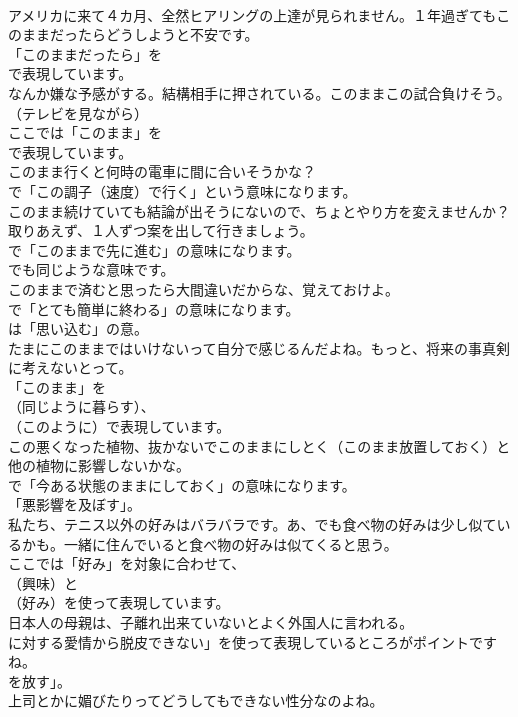 \documentclass[8pt]{extreport}
\begin{document}
\begin{CJK}{UTF8}{min}
\\	アメリカに来て４カ月、全然ヒアリングの上達が見られません。１年過ぎてもこのままだったらどうしようと不安です。 
\\	「このままだったら」を 
\\	で表現しています。	
\\	なんか嫌な予感がする。結構相手に押されている。このままこの試合負けそう。（テレビを見ながら） 
\\	ここでは「このまま」を 
\\	で表現しています。	
\\	このまま行くと何時の電車に間に合いそうかな？ 
\\	で「この調子（速度）で行く」という意味になります。	
\\	このまま続けていても結論が出そうにないので、ちょとやり方を変えませんか？取りあえず、１人ずつ案を出して行きましょう。 
\\	で「このままで先に進む」の意味になります。
\\	でも同じような意味です。	
\\	このままで済むと思ったら大間違いだからな、覚えておけよ。 
\\	で「とても簡単に終わる」の意味になります。
\\	は「思い込む」の意。	
\\	たまにこのままではいけないって自分で感じるんだよね。もっと、将来の事真剣に考えないとって。 
\\	「このまま」を
\\	（同じように暮らす）、
\\	（このように）で表現しています。	
\\	この悪くなった植物、抜かないでこのままにしとく（このまま放置しておく）と他の植物に影響しないかな。 
\\	で「今ある状態のままにしておく」の意味になります。
\\	「悪影響を及ぼす」。	
\\	私たち、テニス以外の好みはバラバラです。あ、でも食べ物の好みは少し似ているかも。一緒に住んでいると食べ物の好みは似てくると思う。 
\\	ここでは「好み」を対象に合わせて、
\\	（興味）と
\\	（好み）を使って表現しています。	
\\	日本人の母親は、子離れ出来ていないとよく外国人に言われる。 
\\	に対する愛情から脱皮できない」を使って表現しているところがポイントですね。
\\	を放す」。	
\\	上司とかに媚びたりってどうしてもできない性分なのよね。 

\end{CJK}
\end{document}
